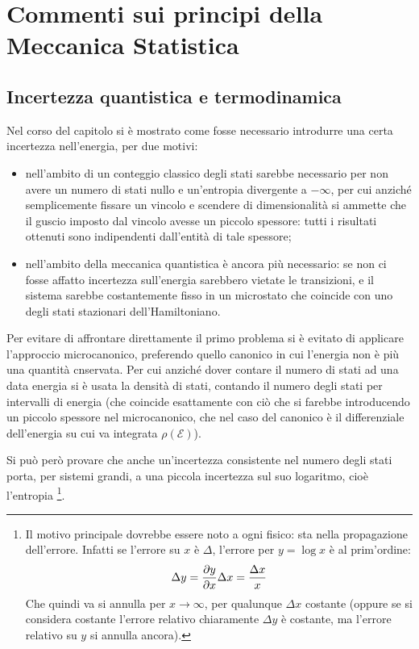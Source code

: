 \section{Commenti sui principi della Meccanica Statistica}
\label{sec:princremark}

\subsection{Incertezza quantistica e termodinamica}
Nel corso del capitolo si è mostrato come fosse necessario introdurre una certa incertezza nell'energia, per due motivi:
\begin{itemize}
	\item nell'ambito di un conteggio classico degli stati sarebbe necessario per non avere un numero di stati nullo e un'entropia divergente a $-\infty$, per cui anziché semplicemente fissare un vincolo e scendere di dimensionalità si ammette che il guscio imposto dal vincolo avesse un piccolo spessore: tutti i risultati ottenuti sono indipendenti dall'entità di tale spessore;
	\item nell'ambito della meccanica quantistica è ancora più necessario: se non ci fosse affatto incertezza sull'energia sarebbero vietate le transizioni, e il sistema sarebbe costantemente fisso in un microstato che coincide con uno degli stati stazionari dell'Hamiltoniano.
\end{itemize}

Per evitare di affrontare direttamente il primo problema si è evitato di applicare l'approccio microcanonico, preferendo quello canonico in cui l'energia non è più una quantità cnservata. Per cui anziché dover contare il numero di stati ad una data energia si è usata la densità di stati, contando il numero degli stati per intervalli di energia (che coincide esattamente con ciò che si farebbe introducendo un piccolo spessore nel microcanonico, che nel caso del canonico è il differenziale dell'energia su cui va integrata $\rho(\mathcal{E})$).
\newline

Si può però provare che anche un'incertezza consistente nel numero degli stati porta, per sistemi grandi, a una piccola incertezza sul suo logaritmo, cioè l'entropia
\footnote{Il motivo principale dovrebbe essere noto a ogni fisico: sta nella propagazione dell'errore. Infatti se l'errore su $x$ è $\Delta$, l'errore per $y = \log x$ è al prim'ordine:
\begin{equation*}
\Delta y = \frac{\partial {y}}{\partial {x}} \Delta x = \frac{\Delta x}{x}
\end{equation*}
Che quindi va si annulla per $x \rightarrow \infty$, per qualunque $\Delta x$ costante (oppure se si considera costante l'errore relativo chiaramente $\Delta y$ è costante, ma l'errore relativo su $y$ si annulla ancora).}.
\newline

